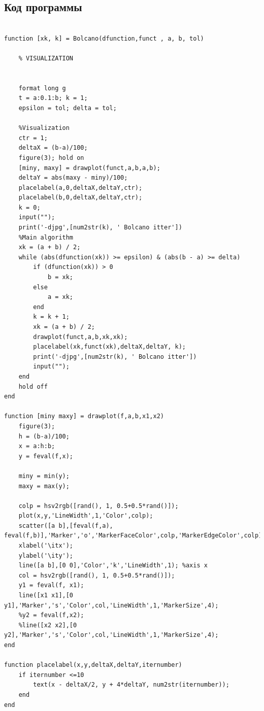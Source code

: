 \documentclass[a4paper,12pt]{article}
\begin{document}
\subsection*{Код программы}
\begin{lstlisting}[style=Matlab-editor, caption=Метод Больцано]

function [xk, k] = Bolcano(dfunction,funct , a, b, tol) 
    
    % VISUALIZATION

    
    format long g
    t = a:0.1:b; k = 1;
    epsilon = tol; delta = tol;

    %Visualization
    ctr = 1;
    deltaX = (b-a)/100;
    figure(3); hold on
    [miny, maxy] = drawplot(funct,a,b,a,b);
    deltaY = abs(maxy - miny)/100;
    placelabel(a,0,deltaX,deltaY,ctr);
    placelabel(b,0,deltaX,deltaY,ctr);
    k = 0;
    input("");
    print('-djpg',[num2str(k), ' Bolcano itter'])
    %Main algorithm
    xk = (a + b) / 2;
    while (abs(dfunction(xk)) >= epsilon) & (abs(b - a) >= delta)
        if (dfunction(xk)) > 0
            b = xk;
        else
            a = xk;
        end
        k = k + 1;
        xk = (a + b) / 2;
        drawplot(funct,a,b,xk,xk);
        placelabel(xk,funct(xk),deltaX,deltaY, k);
        print('-djpg',[num2str(k), ' Bolcano itter'])
        input("");
    end
    hold off
end

function [miny maxy] = drawplot(f,a,b,x1,x2)
    figure(3); 
    h = (b-a)/100;
    x = a:h:b;
    y = feval(f,x);
    
    miny = min(y);
    maxy = max(y);
    
    colp = hsv2rgb([rand(), 1, 0.5+0.5*rand()]);
    plot(x,y,'LineWidth',1,'Color',colp);
    scatter([a b],[feval(f,a), feval(f,b)],'Marker','o','MarkerFaceColor',colp,'MarkerEdgeColor',colp);
    xlabel('\itx');
    ylabel('\ity');
    line([a b],[0 0],'Color','k','LineWidth',1); %axis x
    col = hsv2rgb([rand(), 1, 0.5+0.5*rand()]);
    y1 = feval(f, x1);
    line([x1 x1],[0 y1],'Marker','s','Color',col,'LineWidth',1,'MarkerSize',4); 
    %y2 = feval(f,x2);
    %line([x2 x2],[0 y2],'Marker','s','Color',col,'LineWidth',1,'MarkerSize',4); 
end

function placelabel(x,y,deltaX,deltaY,iternumber)
    if iternumber <=10
        text(x - deltaX/2, y + 4*deltaY, num2str(iternumber));
    end
end

\end{lstlisting}
\end{document}
